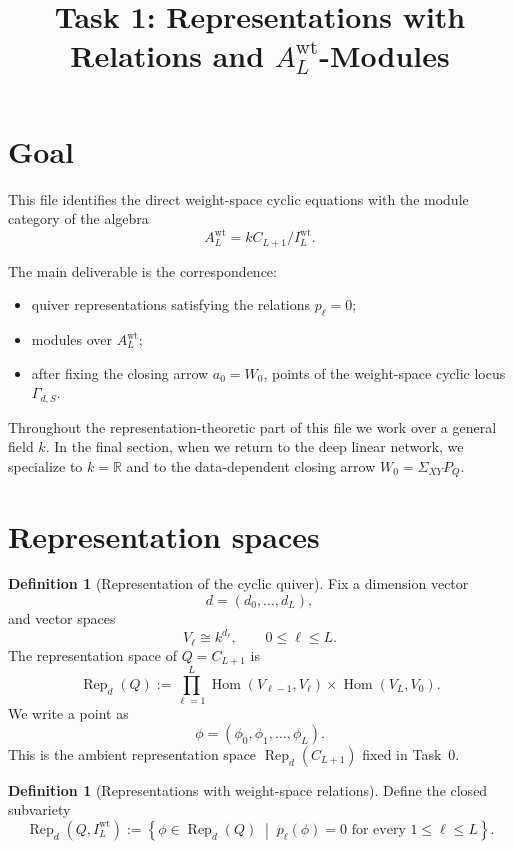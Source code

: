 \documentclass{article}
\title{Task 1: Representations with Relations and $A_L^{\mathrm{wt}}$-Modules}
\date{}
\newcommand{\R}{\mathbb{R}}
\newcommand{\Hom}{\operatorname{Hom}}
\newcommand{\Rep}{\operatorname{Rep}}
\theoremstyle{definition}
\newtheorem{definition}[theorem]{Definition}
\begin{document}
\maketitle

\section{Goal}

This file identifies the direct weight-space cyclic equations with the module
category of the algebra
\[
A_L^{\mathrm{wt}}=kC_{L+1}/I_L^{\mathrm{wt}}.
\]

The main deliverable is the correspondence:

\begin{itemize}
\item quiver representations satisfying the relations $p_\ell=0$;
\item modules over $A_L^{\mathrm{wt}}$;
\item after fixing the closing arrow $a_0=W_0$, points of the weight-space cyclic
  locus $\Gamma_{d,S}$.
\end{itemize}

Throughout the representation-theoretic part of this file we work over a
general field $k$. In the final section, when we return to the deep linear
network, we specialize to $k=\R$ and to the data-dependent closing arrow
$W_0=\Sigma_{XY}P_Q$.

\section{Representation spaces}

\begin{definition}[Representation of the cyclic quiver]
Fix a dimension vector
\[
d=(d_0,\dots,d_L),
\]
and vector spaces
\[
V_\ell\cong k^{d_\ell},
\qquad
0\le \ell\le L.
\]
The representation space of $Q=C_{L+1}$ is
\[
\Rep_d(Q)
:=
\prod_{\ell=1}^L \Hom(V_{\ell-1},V_\ell)\times \Hom(V_L,V_0).
\]
We write a point as
\[
\phi=(\phi_0,\phi_1,\dots,\phi_L).
\]
\noindent
This is the ambient representation space $\Rep_d(C_{L+1})$ fixed in Task~0.
\end{definition}

\begin{definition}[Representations with weight-space relations]
Define the closed subvariety
\[
\Rep_d(Q,I_L^{\mathrm{wt}})
:=
\left\{
\phi\in \Rep_d(Q)
\;\middle|\;
p_\ell(\phi)=0 \text{ for every } 1\le \ell\le L
\right\}.
\]
\end{definition}
\end{document}
